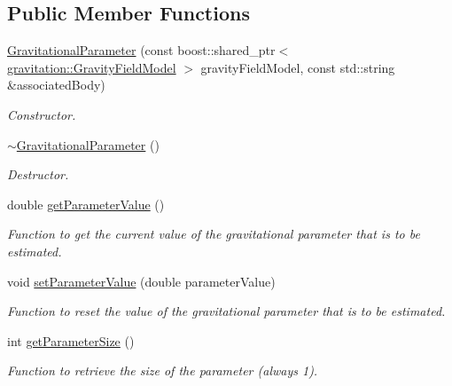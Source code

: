 \subsection*{Public Member Functions}
\begin{DoxyCompactItemize}
\item 
\hyperlink{classtudat_1_1estimatable__parameters_1_1GravitationalParameter_a22d89c85aea31b86082124452ab863a0}{Gravitational\+Parameter} (const boost\+::shared\+\_\+ptr$<$ \hyperlink{classtudat_1_1gravitation_1_1GravityFieldModel}{gravitation\+::\+Gravity\+Field\+Model} $>$ gravity\+Field\+Model, const std\+::string \&associated\+Body)
\begin{DoxyCompactList}\small\item\em Constructor. \end{DoxyCompactList}\item 
\hyperlink{classtudat_1_1estimatable__parameters_1_1GravitationalParameter_a542215c55c183555fac8c511b2c7a23e}{$\sim$\+Gravitational\+Parameter} ()\hypertarget{classtudat_1_1estimatable__parameters_1_1GravitationalParameter_a542215c55c183555fac8c511b2c7a23e}{}\label{classtudat_1_1estimatable__parameters_1_1GravitationalParameter_a542215c55c183555fac8c511b2c7a23e}

\begin{DoxyCompactList}\small\item\em Destructor. \end{DoxyCompactList}\item 
double \hyperlink{classtudat_1_1estimatable__parameters_1_1GravitationalParameter_a86a5d5c5cbc0c898525a0cc8385d931e}{get\+Parameter\+Value} ()
\begin{DoxyCompactList}\small\item\em Function to get the current value of the gravitational parameter that is to be estimated. \end{DoxyCompactList}\item 
void \hyperlink{classtudat_1_1estimatable__parameters_1_1GravitationalParameter_ab1610caa2f08b3b4988d56f60ab9ac89}{set\+Parameter\+Value} (double parameter\+Value)
\begin{DoxyCompactList}\small\item\em Function to reset the value of the gravitational parameter that is to be estimated. \end{DoxyCompactList}\item 
int \hyperlink{classtudat_1_1estimatable__parameters_1_1GravitationalParameter_a2ba9a012c83544ca802ff58044c6bb78}{get\+Parameter\+Size} ()
\begin{DoxyCompactList}\small\item\em Function to retrieve the size of the parameter (always 1). \end{DoxyCompactList}\end{DoxyCompactItemize}
